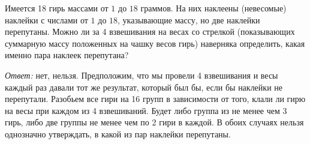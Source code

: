 Имеется 18 гирь массами от $1$ до $18$ граммов.
На них наклеены (невесомые) наклейки с числами от $1$ до $18$, указывающие
массу, но две наклейки перепутаны.
Можно ли за 4 взвешивания на весах со стрелкой
(показывающих суммарную массу положенных на чашку весов гирь)
наверняка определить, какая именно пара наклеек перепутана?

\solution
\emph{Ответ:} нет, нельзя.
Предположим, что мы провели 4 взвешивания и весы каждый раз давали тот же
результат, который был бы, если бы наклейки не перепутали.
Разобьем все гири на 16 групп в зависимости от того, клали ли гирю на весы при
каждом из 4 взвешиваний.
Будет либо группа из не менее чем 3 гирь, либо две группы не менее чем по 2
гири в каждой.
В обоих случаях нельзя однозначно утверждать, в какой из пар наклейки
перепутаны.

